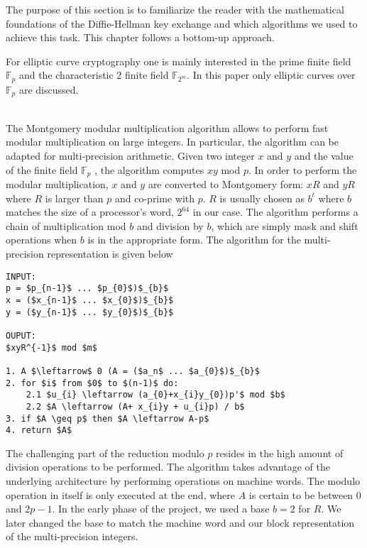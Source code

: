 The purpose of this section is to familiarize the reader with the mathematical foundations of the Diffie-Hellman key exchange and which algorithms we used to achieve this task. This chapter follows a bottom-up approach.

 For elliptic curve cryptography one is mainly interested in the prime finite field $\mathbb{F}_p$ and the characteristic 2 finite field $\mathbb{F}_{2^m}$. In this paper only elliptic curves over $\mathbb{F}_p$ are discussed.

\\The Montgomery modular multiplication algorithm allows to perform fast modular multiplication on large integers. In particular, the algorithm can be adapted for multi-precision arithmetic. Given two integer $x$ and $y$ and the value of the finite field $\mathbb{F}_p$ , the algorithm computes $xy$ mod $p$. In order to perform the modular multiplication, $x$ and $y$ are converted to Montgomery form: $xR$ and $yR$ where $R$ is larger than $p$ and co-prime with $p$. $R$ is usually chosen as $b^{t}$ where $b$ matches the size of a processor's word, $2^{64}$ in our case. The algorithm performs a chain of multiplication mod $b$ and division by $b$, which are simply mask and shift operations when $b$ is in the appropriate form. The algorithm for the multi-precision representation is given below \cite[p. 602]{Menezes:1996}


\begin{lstlisting}[frame=single, mathescape=true, captionpos=b, caption=Mulitprecision Montogmery Modular Multiplication ]
INPUT: 
p = $p_{n-1}$ ... $p_{0}$)$_{b}$
x = ($x_{n-1}$ ... $x_{0}$)$_{b}$
y = ($y_{n-1}$ ... $y_{0}$)$_{b}$

OUPUT:
$xyR^{-1}$ mod $m$

1. A $\leftarrow$ 0 (A = ($a_n$ ... $a_{0}$)$_{b}$
2. for $i$ from $0$ to $(n-1)$ do:
	2.1 $u_{i} \leftarrow (a_{0}+x_{i}y_{0})p'$ mod $b$
	2.2 $A \leftarrow (A+ x_{i}y + u_{i}p) / b$
3. if $A \geq p$ then $A \leftarrow A-p$
4. return $A$
\end{lstlisting}



The challenging part of the reduction modulo $p$ resides in the high amount of division operations to be performed. The algorithm takes advantage of the underlying architecture by performing operations on machine words. The modulo operation in itself is only executed at the end, where $A$ is certain to be between $0$ and $2p-1$. In the early phase of the project, we used a base $b=2$ for $R$. We later changed the base to match the machine word and our block representation of the multi-precision integers. 

